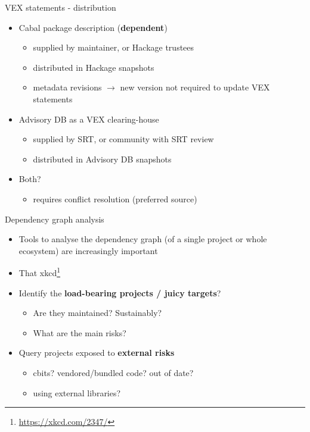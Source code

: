 \documentclass[ignorenonframetext,aspectratio=169,12pt]{beamer}
\begin{document}
\begin{frame}{VEX statements - distribution}
  \begin{itemize}
    \item Cabal package description ({\bf dependent})
      \begin{itemize}
        \item supplied by maintainer, or Hackage trustees
        \item distributed in Hackage snapshots
        \item metadata revisions $\to$ new version not required to
          update VEX statements
      \end{itemize}
    \item Advisory DB as a VEX clearing-house
      \begin{itemize}
        \item supplied by SRT, or community with SRT review
        \item distributed in Advisory DB snapshots
      \end{itemize}
    \item Both?
      \begin{itemize}
        \item requires conflict resolution (preferred source)
      \end{itemize}
  \end{itemize}
\end{frame}

\begin{frame}{Dependency graph analysis}
  \begin{itemize}
    \item Tools to analyse the dependency graph (of a single project
      or whole ecosystem) are increasingly important
    \item That xkcd\footnote{\url{https://xkcd.com/2347/}}
    \item Identify the {\bf load-bearing projects / juicy targets}?
      \begin{itemize}
        \item Are they maintained?  Sustainably?
        \item What are the main risks?
      \end{itemize}
    \item Query projects exposed to {\bf external risks}
      \begin{itemize}
        \item cbits?  vendored/bundled code?  out of date?
        \item using external libraries?
      \end{itemize}
  \end{itemize}
\end{frame}
\end{document}
